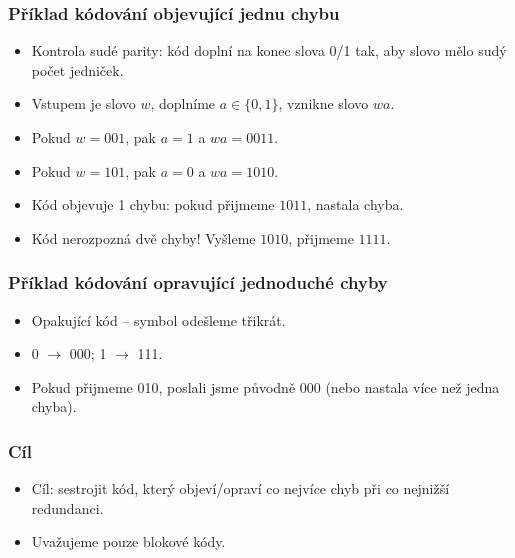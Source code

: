 \documentclass{beamer}
\newenvironment{itemizex}%
  {\large \begin{itemize}%
    \setlength{\itemsep}{8pt}%
    \setlength{\parskip}{8pt}}%
  {\end{itemize}}
\begin{document}
\begin{frame}[t,fragile]\frametitle{Příklad kódování objevující jednu chybu} 
    \begin{itemizex}
        \item Kontrola sudé parity: kód doplní na konec slova 0/1 tak, aby slovo mělo sudý počet jedniček.
        \item Vstupem je slovo $w$, doplníme $a\in\{0,1\}$, vznikne slovo $wa$.
        \item Pokud $w=001$, pak $a=1$ a $wa=0011$.
        \item Pokud $w=101$, pak $a=0$ a $wa=1010$.
        \item Kód objevuje 1 chybu: pokud přijmeme $1011$, nastala chyba.
        \item Kód nerozpozná dvě chyby! Vyšleme $1010$, přijmeme $1111$. 
    \end{itemizex}
\end{frame}


\begin{frame}[t,fragile]\frametitle{Příklad kódování opravující jednoduché chyby} 
    \begin{itemizex}
        \item Opakující kód -- symbol odešleme třikrát. 
        \item 0 $\longrightarrow$ 000; 1 $\longrightarrow$ 111.
        \item Pokud přijmeme 010, poslali jsme původně 000 (nebo nastala více než jedna chyba).
    \end{itemizex}
\end{frame}


\begin{frame}[t,fragile]\frametitle{Cíl} 
    \begin{itemizex}
        \item Cíl: sestrojit kód, který objeví/opraví co nejvíce chyb při co nejnižší redundanci.
        \item Uvažujeme pouze blokové kódy.
    \end{itemizex}
\end{frame}
\end{document}
